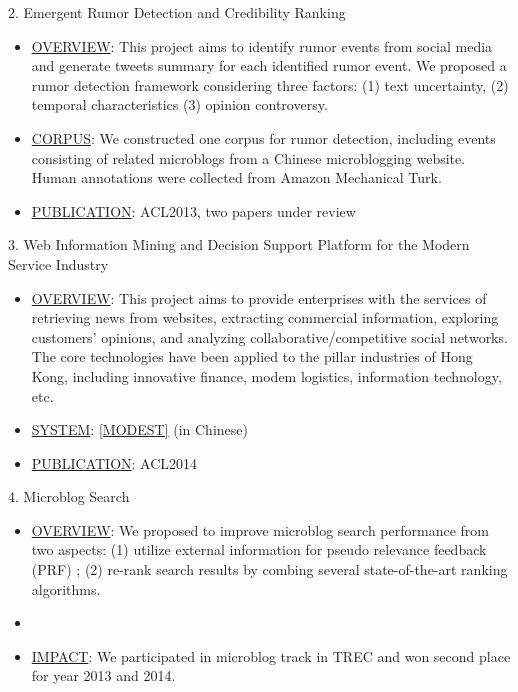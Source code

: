 \documentclass[9.5pt]{article}
\begin{document}
2. Emergent Rumor Detection and Credibility Ranking
\begin{itemize}
\itemsep-0.2em
	\item \underline{OVERVIEW}: This project aims to identify rumor events from social media and generate tweets summary for each identified rumor event. We proposed a rumor detection framework considering three factors: (1) text uncertainty, (2) temporal characteristics (3) opinion controversy.
	\item \underline{CORPUS}: We constructed one corpus for rumor detection, including events consisting of related microblogs from a Chinese microblogging website. Human annotations were collected from Amazon Mechanical Turk.
	\item \underline{PUBLICATION}: ACL2013, two papers under review
\end{itemize}

3. Web Information Mining and Decision Support Platform for the Modern Service Industry
\begin{itemize}
\itemsep-0.2em
	\item \underline{OVERVIEW}: This project aims to provide enterprises with the services of retrieving news from websites, extracting commercial information, exploring customers' opinions, and analyzing collaborative/competitive social networks. The core technologies have been applied to the pillar industries of Hong Kong, including innovative finance, modem logistics, information technology, etc. 
	\item \underline{SYSTEM}: \href{http://sepc111.se.cuhk.edu.hk:8080/modest}{[MODEST]} (in Chinese)
	\item \underline{PUBLICATION}: ACL2014
\end{itemize}

4. Microblog Search
\begin{itemize}
\itemsep-0.2em
	\item \underline{OVERVIEW}: We proposed to improve microblog search performance from two aspects: (1) utilize external information for pseudo relevance feedback (PRF) ; (2) re-rank search results by combing several state-of-the-art ranking algorithms.  
	\item {}
	\item \underline{IMPACT}: We participated in microblog track in TREC and won second place for year 2013 and 2014. 
\end{itemize}
\end{document}
